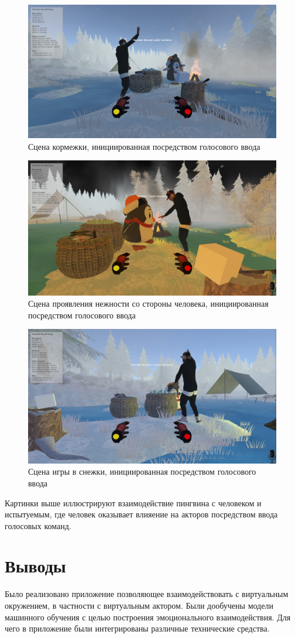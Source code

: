 \begin{figure}[h]
\includegraphics[width=0.75\columnwidth]{./img/peni/kormejka.jpg}
\centering
\caption{Сцена кормежки, инициированная посредством голосового ввода}
\label{pic:kormejka}
\end{figure}

\begin{figure}[h]
\includegraphics[width=0.75\columnwidth]{./img/peni/nejnost.png}
\centering
\caption{Сцена проявления нежности со стороны человека, инициированная посредством голосового ввода}
\label{pic:nejnost}
\end{figure}

\begin{figure}[h]
\includegraphics[width=0.75\columnwidth]{./img/peni/snejok.jpg}
\centering
\caption{Сцена игры в снежки, инициированная посредством голосового ввода}
\label{pic:snejok}
\end{figure}

Картинки выше иллюстрируют взаимодействие пингвина с человеком и испытуемым, 
где человек оказывает влияение на акторов посредством ввода голосовых команд.

\section{Выводы}

Было реализовано приложение позволяющее взаимодействовать с виртуальным окружением, в частности с виртуальным актором. 
Были дообучены модели машинного обучения с целью построения эмоционального взаимодействия. 
Для чего в приложение были интегрированы различные технические средства.


